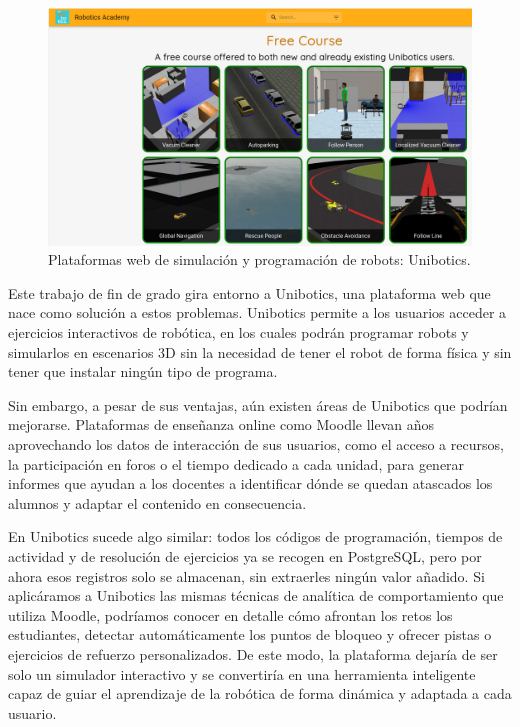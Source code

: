 \documentclass[a4paper, 12pt]{book}
\begin{document}
\begin{figure}[H]
    \centering
    \includegraphics[width=1.1\textwidth]{img/unibotics.png}
    \caption{Plataformas web de simulación y programación de robots: Unibotics.}
    \label{fig:unibotics}
\end{figure}
Este trabajo de fin de grado gira entorno a Unibotics, una plataforma web que nace como solución a estos problemas. Unibotics permite a los usuarios acceder a ejercicios interactivos de robótica, en los cuales podrán programar robots y simularlos en escenarios 3D sin la necesidad de tener el robot de forma física y sin tener que instalar ningún tipo de programa.

Sin embargo, a pesar de sus ventajas, aún existen áreas de Unibotics que podrían mejorarse. Plataformas de enseñanza online como Moodle \cite{einhardt2016moodle} llevan años aprovechando los datos de interacción de sus usuarios, como el acceso a recursos, la participación en foros o el tiempo dedicado a cada unidad, para generar informes que ayudan a los docentes a identificar dónde se quedan atascados los alumnos y adaptar el contenido en consecuencia.

En Unibotics sucede algo similar: todos los códigos de programación, tiempos de actividad y de resolución de ejercicios ya se recogen en PostgreSQL, pero por ahora esos registros solo se almacenan, sin extraerles ningún valor añadido. Si aplicáramos a Unibotics las mismas técnicas de analítica de comportamiento que utiliza Moodle, podríamos conocer en detalle cómo afrontan los retos los estudiantes, detectar automáticamente los puntos de bloqueo y ofrecer pistas o ejercicios de refuerzo personalizados. De este modo, la plataforma dejaría de ser solo un simulador interactivo y se convertiría en una herramienta inteligente capaz de guiar el aprendizaje de la robótica de forma dinámica y adaptada a cada usuario.
\end{document}
